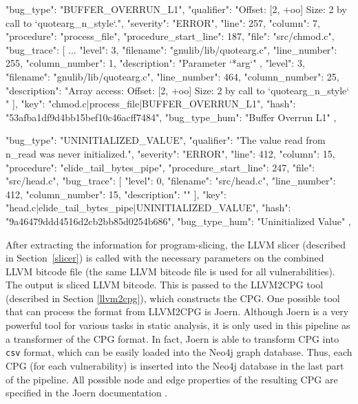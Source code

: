     {
        "bug_type": "BUFFER_OVERRUN_L1",
        "qualifier": "Offset: [2, +oo] Size: 2 by call to `quotearg_n_style`.",
        "severity": "ERROR",
        "line": 257,
        "column": 7,
        "procedure": "process_file",
        "procedure_start_line": 187,
        "file": "src/chmod.c",
        "bug_trace": [
                ...
            {
                "level": 3,
                "filename": "gnulib/lib/quotearg.c",
                "line_number": 255,
                "column_number": 1,
                "description": "Parameter `*arg`"
            },
            {
                "level": 3,
                "filename": "gnulib/lib/quotearg.c",
                "line_number": 464,
                "column_number": 25,
                "description": "Array access: Offset: [2, +oo] Size: 2 by call to `quotearg_n_style` "
            }
        ],
        "key": "chmod.c|process_file|BUFFER_OVERRUN_L1",
        "hash": "53afba1df9d4bb15bef10c46acff7484",
        "bug_type_hum": "Buffer Overrun L1"
    },


        {
        "bug_type": "UNINITIALIZED_VALUE",
        "qualifier": "The value read from n_read was never initialized.",
        "severity": "ERROR",
        "line": 412,
        "column": 15,
        "procedure": "elide_tail_bytes_pipe",
        "procedure_start_line": 247,
        "file": "src/head.c",
        "bug_trace": [
            {
                "level": 0,
                "filename": "src/head.c",
                "line_number": 412,
                "column_number": 15,
                "description": ""
            }
        ],
        "key": "head.c|elide_tail_bytes_pipe|UNINITIALIZED_VALUE",
        "hash": "9a46479ddd4516d2cb2bb85d0254b686",
        "bug_type_hum": "Uninitialized Value"
    },
\fi

After extracting the information for program-slicing, the LLVM slicer (described in Section~\ref{slicer}) is called with the necessary parameters on the combined LLVM bitcode file (the same LLVM bitcode file is used for all vulnerabilities). The output is sliced LLVM bitcode. This is passed to the LLVM2CPG tool (described in Section \ref{llvm2cpg}), which constructs the CPG. One possible tool that can process the format from LLVM2CPG is Joern. Although Joern is a very powerful tool for various tasks in static analysis, it is only used in this pipeline as a transformer of the CPG format. In fact, Joern is able to transform CPG into \texttt{csv} format, which can be easily loaded into the Neo4j graph database. Thus, each CPG (for each vulnerability) is inserted into the Neo4j database in the last part of the pipeline. All possible node and edge properties of the resulting CPG are specified in the Joern documentation \cite{joern-doc}.

